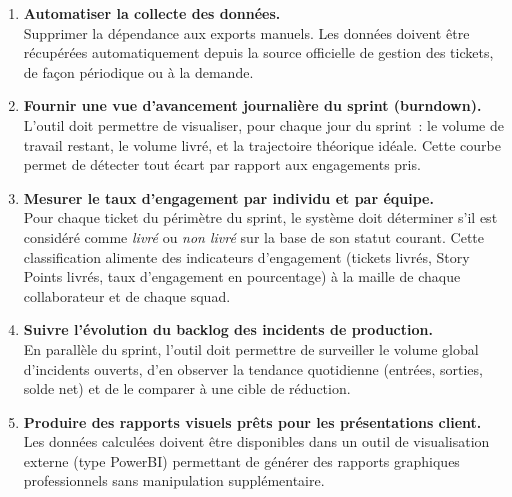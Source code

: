 \documentclass[12pt, a4paper]{article}
\begin{document}
\begin{enumerate}[leftmargin=2em, itemsep=6pt]

  \item \textbf{Automatiser la collecte des données.}\\
        Supprimer la dépendance aux exports manuels. Les données doivent être
        récupérées automatiquement depuis la source officielle de gestion des
        tickets, de façon périodique ou à la demande.

  \item \textbf{Fournir une vue d'avancement journalière du sprint (burndown).}\\
        L'outil doit permettre de visualiser, pour chaque jour du sprint~:
        le volume de travail restant, le volume livré, et la trajectoire
        théorique idéale. Cette courbe permet de détecter tout écart par rapport
        aux engagements pris.

  \item \textbf{Mesurer le taux d'engagement par individu et par équipe.}\\
        Pour chaque ticket du périmètre du sprint, le système doit déterminer
        s'il est considéré comme \emph{livré} ou \emph{non livré} sur la base
        de son statut courant. Cette classification alimente des indicateurs
        d'engagement (tickets livrés, Story Points livrés, taux d'engagement en
        pourcentage) à la maille de chaque collaborateur et de chaque squad.

  \item \textbf{Suivre l'évolution du backlog des incidents de production.}\\
        En parallèle du sprint, l'outil doit permettre de surveiller le volume
        global d'incidents ouverts, d'en observer la tendance quotidienne
        (entrées, sorties, solde net) et de le comparer à une cible de réduction.

  \item \textbf{Produire des rapports visuels prêts pour les présentations client.}\\
        Les données calculées doivent être disponibles dans un outil de
        visualisation externe (type PowerBI) permettant de générer des rapports
        graphiques professionnels sans manipulation supplémentaire.

\end{enumerate}

\vspace{0.4cm}
\end{document}
